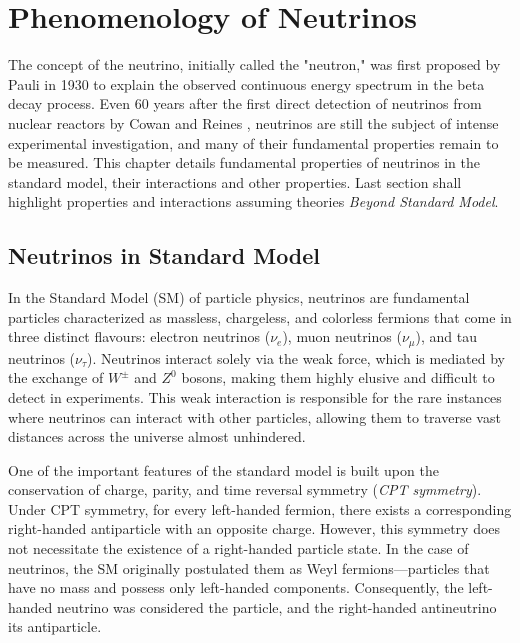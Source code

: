 \setchapterpreamble[u]{\margintoc}
\chapter{Phenomenology of Neutrinos}

The concept of the neutrino, initially called the "neutron," was first proposed by Pauli in 1930  to explain the observed continuous energy spectrum in the beta decay process. Even 60 years after the first direct detection of neutrinos from nuclear reactors by Cowan and Reines , neutrinos are still the subject of intense experimental investigation, and many of their fundamental properties remain to be measured. This chapter details fundamental properties of neutrinos in the standard model, their interactions and other properties. Last section shall highlight properties and interactions assuming theories \emph{Beyond Standard Model}.

\section{Neutrinos in Standard Model}
\label{sec:sm_nu}
In the Standard Model (SM) of particle physics, neutrinos are fundamental particles characterized as massless, chargeless, and colorless fermions that come in three distinct flavours: electron neutrinos ($\nu_e$), muon neutrinos ($\nu_\mu$), and tau neutrinos ($\nu_\tau$). Neutrinos interact solely via the weak force, which is mediated by the exchange of $W^\pm$ and $Z^0$ bosons, making them highly elusive and difficult to detect in experiments. This weak interaction is responsible for the rare instances where neutrinos can interact with other particles, allowing them to traverse vast distances across the universe almost unhindered. 

One of the important features of the standard model is built upon the conservation of charge, parity, and time reversal symmetry (\emph{CPT symmetry}). Under CPT symmetry, for every left-handed fermion, there exists a corresponding right-handed antiparticle with an opposite charge. However, this symmetry does not necessitate the existence of a right-handed particle state. In the case of neutrinos, the SM originally postulated them as Weyl fermions—particles that have no mass and possess only left-handed components. Consequently, the left-handed neutrino was considered the particle, and the right-handed antineutrino its antiparticle. 


